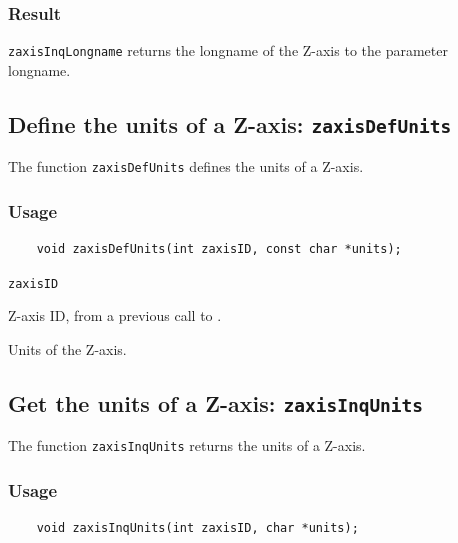 \subsubsection*{Result}

{\texttt{zaxisInqLongname}} returns the longname of the Z-axis to the parameter longname.



\subsection{Define the units of a Z-axis: \texttt{zaxisDefUnits}}
\label{zaxisDefUnits}

The function {\texttt{zaxisDefUnits}} defines the units of a Z-axis.

\subsubsection*{Usage}

\begin{verbatim}
    void zaxisDefUnits(int zaxisID, const char *units);
\end{verbatim}

\hspace*{4mm}\begin{minipage}[]{15cm}
\begin{deflist}{\texttt{zaxisID}\ }
\item[\texttt{zaxisID}]
Z-axis ID, from a previous call to {}.
\item[\texttt{units}]
Units of the Z-axis.

\end{deflist}
\end{minipage}


\subsection{Get the units of a Z-axis: \texttt{zaxisInqUnits}}
\label{zaxisInqUnits}

The function {\texttt{zaxisInqUnits}} returns the units of a Z-axis.

\subsubsection*{Usage}

\begin{verbatim}
    void zaxisInqUnits(int zaxisID, char *units);
\end{verbatim}

